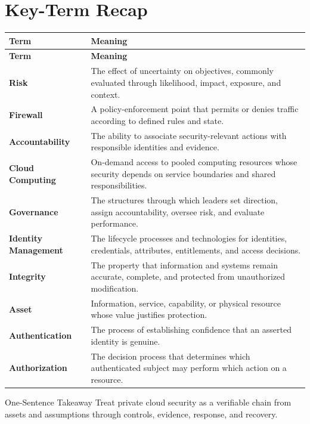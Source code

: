 \documentclass[11pt,letterpaper]{article}
\begin{document}
\section*{Key-Term Recap}
\begin{longtable}{>{\raggedright\arraybackslash}p{}>{\raggedright\arraybackslash}p{}}
\toprule\rowcolor{Navy}\color{white}\textbf{Term} & \color{white}\textbf{Meaning}\\\midrule
\endfirsthead
\toprule\rowcolor{Navy}\color{white}\textbf{Term} & \color{white}\textbf{Meaning}\\\midrule
\endhead
\textbf{Risk} & The effect of uncertainty on objectives, commonly evaluated through likelihood, impact, exposure, and context. \\\midrule
\textbf{Firewall} & A policy-enforcement point that permits or denies traffic according to defined rules and state. \\\midrule
\textbf{Accountability} & The ability to associate security-relevant actions with responsible identities and evidence. \\\midrule
\textbf{Cloud Computing} & On-demand access to pooled computing resources whose security depends on service boundaries and shared responsibilities. \\\midrule
\textbf{Governance} & The structures through which leaders set direction, assign accountability, oversee risk, and evaluate performance. \\\midrule
\textbf{Identity Management} & The lifecycle processes and technologies for identities, credentials, attributes, entitlements, and access decisions. \\\midrule
\textbf{Integrity} & The property that information and systems remain accurate, complete, and protected from unauthorized modification. \\\midrule
\textbf{Asset} & Information, service, capability, or physical resource whose value justifies protection. \\\midrule
\textbf{Authentication} & The process of establishing confidence that an asserted identity is genuine. \\\midrule
\textbf{Authorization} & The decision process that determines which authenticated subject may perform which action on a resource. \\\midrule
\bottomrule
\end{longtable}
\begin{CornellExamBox}{One-Sentence Takeaway}
Treat private cloud security as a verifiable chain from assets and assumptions through controls, evidence, response, and recovery.
\end{CornellExamBox}
\end{document}
